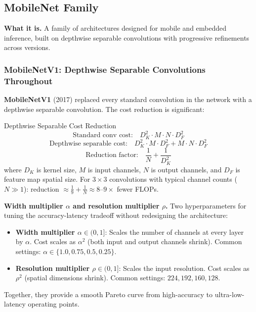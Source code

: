 \subsection{MobileNet Family}

\textbf{What it is.} A family of architectures designed for mobile and embedded inference, built on depthwise separable convolutions with progressive refinements across versions.

\subsubsection*{MobileNetV1: Depthwise Separable Convolutions Throughout}

\textbf{MobileNetV1} (2017) replaced every standard convolution in the network with a depthwise separable convolution. The cost reduction is significant:

\begin{mathresult}{Depthwise Separable Cost Reduction}
\begin{equation}
\text{Standard conv cost:} \quad D_K^2 \cdot M \cdot N \cdot D_F^2
\end{equation}
\begin{equation}
\text{Depthwise separable cost:} \quad D_K^2 \cdot M \cdot D_F^2 + M \cdot N \cdot D_F^2
\end{equation}
\begin{equation}
\text{Reduction factor:} \quad \frac{1}{N} + \frac{1}{D_K^2}
\end{equation}
where $D_K$ is kernel size, $M$ is input channels, $N$ is output channels, and $D_F$ is feature map spatial size. For $3 \times 3$ convolutions with typical channel counts ($N \gg 1$): reduction $\approx \frac{1}{9} + \frac{1}{N} \approx 8$--$9\times$ fewer FLOPs.
\end{mathresult}

\textbf{Width multiplier $\alpha$ and resolution multiplier $\rho$.} Two hyperparameters for tuning the accuracy-latency tradeoff without redesigning the architecture:
\begin{itemize}
    \item \textbf{Width multiplier $\alpha \in (0, 1]$}: Scales the number of channels at every layer by $\alpha$. Cost scales as $\alpha^2$ (both input and output channels shrink). Common settings: $\alpha \in \{1.0, 0.75, 0.5, 0.25\}$.
    \item \textbf{Resolution multiplier $\rho \in (0, 1]$}: Scales the input resolution. Cost scales as $\rho^2$ (spatial dimensions shrink). Common settings: $224, 192, 160, 128$.
\end{itemize}
Together, they provide a smooth Pareto curve from high-accuracy to ultra-low-latency operating points.

